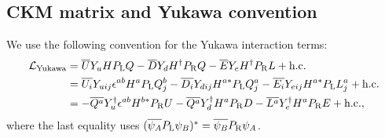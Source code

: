 \documentclass[CheatSheet]{subfiles}
\begin{document}
\subsection{CKM matrix and Yukawa convention}\label{sec:SM-CKM}
We use the following convention for  the Yukawa interaction terms:
\begin{align}
  \mathcal L\w{Yukawa}&=
  \overline{U}\Yu H \PL Q
- \overline{D}\Yd H^\dagger \PR Q
- \overline{E}\Ye H^\dagger \PR L + \text{h.c.}
\\&=
  \overline{U_i}\Yu[ij] \epsilon^{ab}H^a \PL Q_j^b
- \overline{D_i}\Yd[ij] H^{a*} \PL Q_j^a
- \overline{E_i}\Ye[ij] H^{a*} \PL L_j^a + \text{h.c.}
\\&=
- \overline{Q^a}\Yu^\dagger \epsilon^{ab}H^{b*} \PR U
- \overline{Q^a}\Yd^\dagger H^{a} \PR D
- \overline{L^a}\Ye^\dagger H^{a} \PR E + \text{h.c.},
\end{align}
where the last equality uses $(\overline{\psi_A}\PL\psi_B)^*=\overline{\psi_B}\PR\psi_A$.
\end{document}
